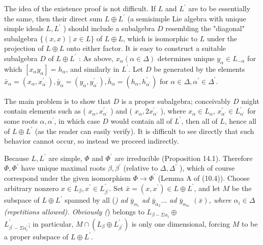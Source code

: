 \documentclass[10pt]{article}
\begin{document}
The idea of the existence proof is not difficult. If $L$ and $L^{\prime}$ are to be essentially the same, then their direct sum $L \oplus L^{\prime}$ (a semisimple Lie algebra with unique simple ideals $L, L^{\prime}$ ) should include a subalgebra $D$ resembling the "diagonal" subalgebra $\{(x, x) \mid x \in L\}$ of $L \oplus L$, which is isomorphic to $L$ under the projection of $L \oplus L$ onto either factor. It is easy to construct a suitable subalgebra $D$ of $L \oplus L^{\prime}$ : As above, $x_{\alpha}(\alpha \in \Delta)$ determines unique $y_{\alpha} \in L_{-\alpha}$ for which $\left[x_{\alpha} y_{\alpha}\right]=h_{\alpha}$, and similarly in $L^{\prime}$. Let $D$ be generated by the elements $\bar{x}_{\alpha}=\left(x_{\alpha}, x_{\alpha^{\prime}}^{\prime}\right), \bar{y}_{\alpha}=\left(y_{\alpha}, y_{\alpha^{\prime}}^{\prime}\right), \bar{h}_{\alpha}=\left(h_{\alpha}, h_{\alpha^{\prime}}^{\prime}\right)$ for $\alpha \in \Delta, \alpha^{\prime} \in \Delta^{\prime}$.

The main problem is to show that $D$ is a proper subalgebra; conceivably $D$ might contain elements such as ( $x_{\alpha}, x_{\alpha^{\prime}}^{\prime}$ ) and ( $x_{\alpha}, 2 x_{\alpha^{\prime}}^{\prime}$ ), where $x_{\alpha} \in L_{\alpha}$, $x_{\alpha^{\prime}}^{\prime} \in L_{\alpha^{\prime}}^{\prime}$ for some roots $\alpha, \alpha^{\prime}$, in which case $D$ would contain all of $L^{\prime}$, then all of $L$, hence all of $L \oplus L^{\prime}$ (as the reader can easily verify). It is difficult to see directly that such behavior cannot occur, so instead we proceed indirectly.

Because $L, L^{\prime}$ are simple, $\Phi$ and $\Phi^{\prime}$ are irreducible (Proposition 14.1). Therefore $\Phi, \Phi^{\prime}$ have unique maximal roots $\beta, \beta^{\prime}$ (relative to $\Delta, \Delta^{\prime}$ ), which of course correspond under the given isomorphism $\Phi \rightarrow \Phi^{\prime}$ (Lemma A of (10.4)). Choose arbitrary nonzero $x \in L_{\beta}, x^{\prime} \in L_{\beta^{\prime}}^{\prime}$. Set $\bar{x}=\left(x, x^{\prime}\right) \in L \oplus L^{\prime}$, and let $M$ be the subspace of $L \oplus L^{\prime}$ spanned by all (\textit{) ad $\bar{y}_{\alpha_{1}}$ ad $\bar{y}_{\alpha_{2}} \ldots$ ad $\bar{y}_{\alpha_{m}}$ $(\bar{x})$, where $\alpha_{i} \in \Delta$ (repetitions allowed). Obviously (}) belongs to $L_{\beta-\Sigma \alpha_{i}} \oplus$\\
$L_{\beta^{\prime}-\Sigma \alpha_{i}^{\prime}}^{\prime}$; in particular, $M \cap\left(L_{\beta} \oplus L_{\beta^{\prime}}^{\prime}\right)$ is only one dimensional, forcing $M$ to be a proper subspace of $L \oplus L^{\prime}$.
\end{document}
